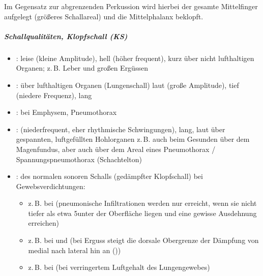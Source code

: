 {\begin{itemize}
  Im Gegensatz zur abgrenzenden Perkussion wird hierbei der gesamte
  Mittelfinger aufgelegt (größeres Schallareal) und die
  Mittelphalanx beklopft.
\end{itemize}
\subparagraph{Schallqualitäten, Klopfschall (KS)}
\begin{itemize}
  \item {}: leise (kleine Amplitude), hell
  (höher frequent), kurz über nicht lufthaltigen
  Organen; z.\,B. Leber und großen Ergüssen
  \item {}: über lufthaltigen Organen
  (Lungenschall) laut (große
  Amplitude), tief (niedere Frequenz), lang
  \item {}: bei Emphysem,
  Pneumothorax
  \item {}: (niederfrequent,
  eher rhythmische Schwingungen), lang, laut über gespannten,
  luftgefüllten Hohlorganen z.\,B. auch beim Gesunden über
  dem Magenfundus, aber auch über dem Areal eines
  Pneumothorax / Spannungspneumothorax
  (Schachtelton)
  \item {}: des normalen sonoren Schalls
  (gedämpfter Klopfschall) bei Gewebsverdichtungen:
  \begin{itemize}
    \item z.\,B. bei 
  (pneumonische Infiltrationen werden nur erreicht, wenn
  sie nicht tiefer als etwa 5\CM* unter der Oberfläche
  liegen und eine gewisse Ausdehnung erreichen)
  \item z.\,B. bei
   und  (bei Erguss steigt
  die dorsale Obergrenze der Dämpfung von medial nach lateral hin
  an ())
  \item z.\,B. bei  (bei verringertem Luftgehalt des
  Lungengewebes)
  \end{itemize}

\end{itemize}



% 
%   

}
